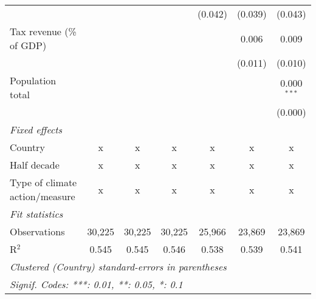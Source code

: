 \begin{tabular}{lcccccc}
                                                                &         &         &                & (0.042)      & (0.039)       & (0.043)\\   
   Tax revenue (\% of GDP)                                      &         &         &                &              & 0.006         & 0.009\\   
                                                                &         &         &                &              & (0.011)       & (0.010)\\   
   Population total                                             &         &         &                &              &               & 0.000$^{***}$\\   
                                                                &         &         &                &              &               & (0.000)\\   
   \emph{Fixed effects}\\
   Country                                                      & x       & x       & x              & x            & x             & x\\  
   Half decade                                                  & x       & x       & x              & x            & x             & x\\  
   Type of climate action/measure                               & x       & x       & x              & x            & x             & x\\  
   \midrule \emph{Fit statistics}\\
   Observations                                                 & 30,225  & 30,225  & 30,225         & 25,966       & 23,869        & 23,869\\  
   R$^2$                                                        & 0.545   & 0.545   & 0.546          & 0.538        & 0.539         & 0.541\\  
   \midrule
   \multicolumn{7}{l}{\emph{Clustered (Country) standard-errors in parentheses}}\\
   \multicolumn{7}{l}{\emph{Signif. Codes: ***: 0.01, **: 0.05, *: 0.1}}\\
\end{tabular}
\par\endgroup


